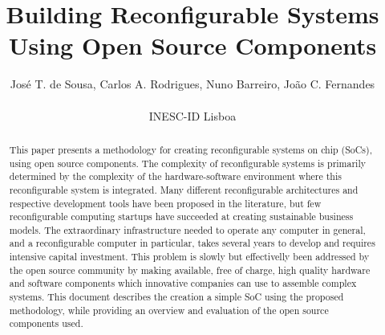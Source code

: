 \documentclass{IEEEconfA4}
\begin{document}
\title{Building Reconfigurable Systems Using Open Source Components}


\author{Jos\'e T. de Sousa, Carlos A. Rodrigues, Nuno Barreiro, Jo\~ao C. Fernandes\\
  \begin{affiliation}
    INESC-ID Lisboa\\
  \end{affiliation}}

\date{}

\maketitle


\begin{abstract}
This paper presents a methodology for creating reconfigurable systems on chip (SoCs), using open source components. The complexity of reconfigurable systems is primarily determined by the complexity of the hardware-software environment where this reconfigurable system is integrated. Many different reconfigurable architectures and respective development tools have been proposed in the literature, but few reconfigurable computing startups have succeeded at creating sustainable business models. The extraordinary infrastructure needed to operate any computer in general, and a reconfigurable computer in particular, takes several years to develop and requires intensive capital investment. This problem is slowly but effectivelly been addressed by the open source community by making available, free of charge, high quality hardware and software components which innovative companies can use to assemble complex systems. This document describes the creation a simple SoC using the proposed methodology, while providing an overview and evaluation of the open source components used. 
\end{abstract}

\end{document}
